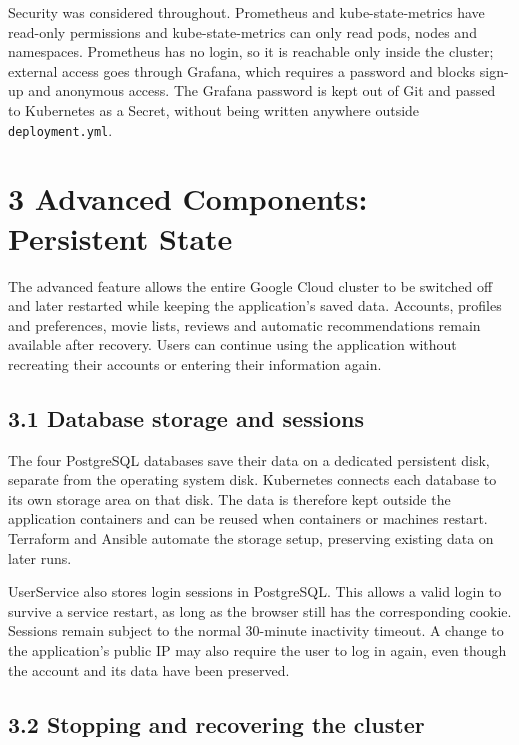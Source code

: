 \documentclass[10pt,a4paper]{article}
\begin{document}
Security was considered throughout. Prometheus and kube-state-metrics have read-only permissions and kube-state-metrics can only read pods, nodes and namespaces. Prometheus has no login, so it is reachable only inside the cluster; external access goes through Grafana, which requires a password and blocks sign-up and anonymous access. The Grafana password is kept out of Git and passed to Kubernetes as a Secret, without being written anywhere outside \texttt{deployment.yml}.

\section*{3 Advanced Components: Persistent State}

The advanced feature allows the entire Google Cloud cluster to be switched off and later restarted while keeping the application's saved data. Accounts, profiles and preferences, movie lists, reviews and automatic recommendations remain available after recovery. Users can continue using the application without recreating their accounts or entering their information again.

\subsection*{3.1 Database storage and sessions}

The four PostgreSQL databases save their data on a dedicated persistent disk, separate from the operating system disk. Kubernetes connects each database to its own storage area on that disk. The data is therefore kept outside the application containers and can be reused when containers or machines restart. Terraform and Ansible automate the storage setup, preserving existing data on later runs.

UserService also stores login sessions in PostgreSQL. This allows a valid login to survive a service restart, as long as the browser still has the corresponding cookie. Sessions remain subject to the normal 30-minute inactivity timeout. A change to the application's public IP may also require the user to log in again, even though the account and its data have been preserved.

\subsection*{3.2 Stopping and recovering the cluster}
\end{document}

